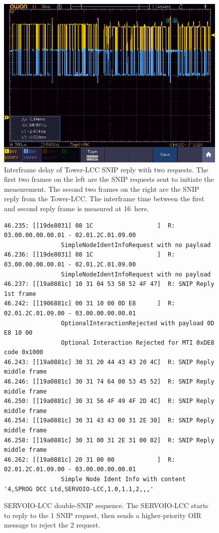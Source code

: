 \documentclass[11pt]{article}
\begin{document}
\begin{figure}[!htbp]
\centering
\includegraphics[width=1.0\linewidth]{2SNIP_TWR_Spacing}
\caption{Interframe delay of Tower-LCC SNIP reply with two requests.
The first two frames on the left are the SNIP requests sent to initiate the measurement.
The second two frames on the right are the SNIP reply from the Tower-LCC.
The interframe time between the first and second reply frame is measured at 16\us~here.
}
\label{fig:double_TWR_SNIP_interframe}
\end{figure}


\begin{figure}[!htbp]
\begin{verbatim}
46.235: [[19de8031] 08 1C                  ]  R: 03.00.00.00.00.01 - 02.01.2C.01.09.00 
                SimpleNodeIdentInfoRequest with no payload
46.236: [[19de8031] 08 1C                  ]  R: 03.00.00.00.00.01 - 02.01.2C.01.09.00 
                SimpleNodeIdentInfoRequest with no payload
46.237: [[19a0881c] 10 31 04 53 50 52 4F 47]  R: SNIP Reply 1st frame
46.242: [[1906881c] 00 31 10 00 0D E8      ]  R: 02.01.2C.01.09.00 - 03.00.00.00.00.01 
                OptionalInteractionRejected with payload 0D E8 10 00 
                Optional Interaction Rejected for MTI 0xDE8 code 0x1000
46.243: [[19a0881c] 30 31 20 44 43 43 20 4C]  R: SNIP Reply middle frame
46.246: [[19a0881c] 30 31 74 64 00 53 45 52]  R: SNIP Reply middle frame
46.250: [[19a0881c] 30 31 56 4F 49 4F 2D 4C]  R: SNIP Reply middle frame
46.254: [[19a0881c] 30 31 43 43 00 31 2E 30]  R: SNIP Reply middle frame
46.258: [[19a0881c] 30 31 00 31 2E 31 00 02]  R: SNIP Reply middle frame
46.262: [[19a0881c] 20 31 00 00            ]  R: 02.01.2C.01.09.00 - 03.00.00.00.00.01 
                Simple Node Ident Info with content '4,SPROG DCC Ltd,SERVOIO-LCC,1.0,1.1,2,,,'

\end{verbatim}
\caption{SERVOIO-LCC double-SNIP sequence. The SERVOIO-LCC starts to reply to the 1
        SNIP request, then sends a higher-priority OIR message to reject the
        2 request.}
\label{fig:SERVOIO_double_SNIP_reply_sequence}
\end{figure}
\end{document}
